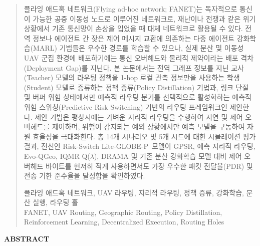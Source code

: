 \documentclass[journal,twocolumn]{IEEEtran}
\newcommand{\method}{GLOBE++ Lite-P+}
\newcommand{\phaseTwelve}{Risk-Switch Lite-GLOBE-P}
\begin{document}
  \begin{quotation}
    \noindent 플라잉 애드혹 네트워크(Flying ad-hoc network; FANET)는 독자적으로 통신이 가능한 공중 이동성 노드로 이루어진 네트워크로, 재난이나 전쟁과 같은 위기 상황에서 기존 통신망이 손상을 입었을 때 대체 네트워크로 활용될 수 있다. 전역 정보나 에이전트 간 잦은 제어 메시지 교환에 의존하는 다중 에이전트 강화학습(MARL) 기법들은 우수한 경로를 학습할 수 있으나, 실제 분산 및 이동성 UAV 군집 환경에 배포하기에는 통신 오버헤드와 물리적 제약이라는 배포 격차(Deployment Gap)를 지닌다. 본 논문에서는 전역 그래프 정보를 지닌 교사(Teacher) 모델의 라우팅 정책을 1-hop 로컬 관측 정보만을 사용하는 학생(Student) 모델로 증류하는 정책 증류(Policy Distillation) 기법과, 링크 단절 및 버퍼 위험 상태에서만 예측적 라우팅 분기를 선택적으로 활성화하는 예측적 위험 스위칭(Predictive Risk Switching) 기반의 라우팅 프레임워크인  제안한다. 제안 기법은 평상시에는 가벼운 지리적 라우팅을 수행하여 지연 및 제어 오버헤드를 제어하며, 위험이 감지되는 예외 상황에서만 예측 모델을 구동하여 자원 효율성을 극대화한다. 총 14개 시나리오 및 5개 시드에 대한 시뮬레이션 평가 결과,  전신인 \phaseTwelve\ 모델이 GPSR, 예측 지리적 라우팅, Evo-QGeo, IQMR Q($\lambda$), DRAMA 및 기존 분산 강화학습 모델 대비 제어 오버헤드 바이트를 현저히 적게 사용하면서도 가장 우수한 패킷 전달율(PDR) 및 전송 기한 준수율을 달성함을 확인하였다.
    
    \vspace{3mm}
     플라잉 애드혹 네트워크, UAV 라우팅, 지리적 라우팅, 정책 증류, 강화학습, 분산 실행, 라우팅 홀 \\
     FANET, UAV Routing, Geographic Routing, Policy Distillation, Reinforcement Learning, Decentralized Execution, Routing Holes
  \end{quotation}
  
  \vspace{5mm}
  \begin{center}
    {\bf ABSTRACT}
    \vspace{3mm}
  \end{center}
  
\end{document}
